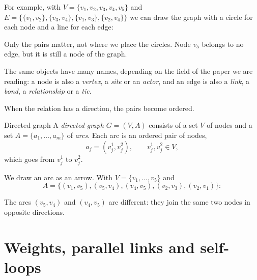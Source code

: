 \documentclass[a4paper,12pt,oneside]{report}
\begin{document}
For example, with $V=\{v_1,v_2,v_3,v_4,v_5\}$ and
$E=\bigl\{\{v_1,v_2\},\{v_3,v_4\},\{v_1,v_3\},\{v_2,v_4\}\bigr\}$ we
can draw the graph with a circle for each node and a line for each
edge:
\begin{center}
\end{center}
Only the pairs matter, not where we place the circles. Node $v_5$
belongs to no edge, but it is still a node of the graph.

The same objects have many names, depending on the field of the paper
we are reading: a node is also a \emph{vertex}, a \emph{site} or an
\emph{actor}, and an edge is also a \emph{link}, a \emph{bond}, a
\emph{relationship} or a \emph{tie}.

When the relation has a direction, the pairs become ordered.

\begin{frameddefn}{Directed graph}\label{def:directed-graph}
A \emph{directed graph} $G=(V,A)$ consists of a set $V$ of nodes and
a set $A=\{a_1,\ldots,a_m\}$ of \emph{arcs}. Each arc is an ordered
pair of nodes,
\[
  a_j=(v_j^1,v_j^2),\qquad v_j^1,v_j^2\in V ,
\]
which goes from $v_j^1$ to $v_j^2$.
\end{frameddefn}

We draw an arc as an arrow. With $V=\{v_1,\ldots,v_5\}$ and
\[
  A=\{(v_1,v_5),(v_5,v_4),(v_4,v_5),(v_2,v_3),(v_2,v_1)\}:
\]
\begin{center}
\end{center}
The arcs $(v_5,v_4)$ and $(v_4,v_5)$ are different: they join the same
two nodes in opposite directions.

\section{Weights, parallel links and self-loops}
\label{sec:graph-variants}
\end{document}
